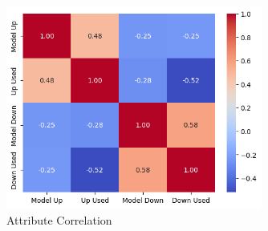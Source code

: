 \begin{figure}[H]
    \centering
    \includegraphics[width=0.75\textwidth]{plots/heatmap_correlation_pred.png}
    \caption{Attribute Correlation}
    \label{fig:Attribute_correlation}
  \end{figure}


 \par





